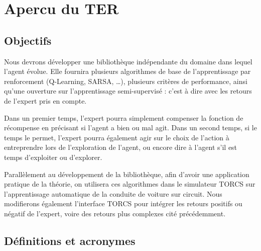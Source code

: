 \documentclass[a4paper,12pt]{article}
\begin{document}
  \begin{titlepage}
   \def\titletype{Plan de développement}
   
  \end{titlepage}

  
  \clearpage

  \tableofcontents

  \clearpage
  
  \renewcommand{\labelitemi}{$\bullet$}
  \renewcommand{\labelitemii}{$\circ$}
  \renewcommand{\labelitemiii}{$\diamond$}
  \renewcommand{\labelitemiv}{$\ast$}
  
  \section{Apercu du TER} 

  \subsection{Objectifs}
	Nous devrons développer une bibliothèque indépendante du domaine dans lequel l'agent évolue. 
	Elle fournira plusieurs algorithmes de base de l'apprentissage par renforcement  (Q-Learning, SARSA, …), 
	plusieurs critères de performance, ainsi qu'une ouverture sur l'apprentissage semi-supervisé : 
	c'est à dire avec les retours de l'expert pris en compte. 
	
	Dans un premier temps, l'expert pourra simplement compenser la fonction de récompense en précisant si 
	l'agent a bien ou mal agit. Dans un second temps, si le temps le permet, l'expert pourra également agir 
	sur le choix de l'action à entreprendre lors de l'exploration de l'agent, ou encore dire à l'agent s'il 
	est temps d'exploiter ou d'explorer.
	
	Parallèlement au développement de la bibliothèque, afin d'avoir une application pratique de la théorie,
	on utilisera ces algorithmes dans le simulateur TORCS sur l'apprentissage automatique de la conduite de 
	voiture sur circuit. Nous modifierons également l'interface TORCS pour intégrer les retours positifs ou 
	négatif de l'expert, voire des retours plus complexes cité précédemment. \cite{CdC}

  
  \nocite{TORCS}
  
  
  

     

  \subsection{Définitions et acronymes} 
  
\end{document}
